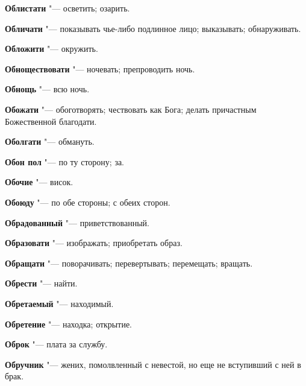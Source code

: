\begin{mymulticols}{2}
\noindent\textbf{Облистати} "--- осветить; озарить. 




\noindent\textbf{Обличати} "--- показывать чье-либо подлинное лицо; выказывать; обнаруживать. 




\noindent\textbf{Обложити} "--- окружить. 




\noindent\textbf{Обноществовати} "--- ночевать; препроводить ночь. 




\noindent\textbf{Обнощь} "--- всю ночь. 




\noindent\textbf{Обожати} "--- обоготворять; чествовать как Бога; делать причастным Божественной благодати. 




\noindent\textbf{Оболгати} "--- обмануть. 




\noindent\textbf{Обон пол} "--- по ту сторону; за. 




\noindent\textbf{Обочие} "--- висок. 




\noindent\textbf{Обоюду} "--- по обе стороны; с обеих сторон. 




\noindent\textbf{Обрадованный} "--- приветствованный. 




\noindent\textbf{Образовати} "--- изображать; приобретать образ. 




\noindent\textbf{Обращати} "--- поворачивать; перевертывать; перемещать; вращать. 




\noindent\textbf{Обрести} "--- найти. 




\noindent\textbf{Обретаемый} "--- находимый. 




\noindent\textbf{Обретение} "--- находка; открытие. 




\noindent\textbf{Оброк} "--- плата за службу. 




\noindent\textbf{Обручник} "--- жених, помолвленный с невестой, но еще не вступивший с ней в брак. 





\end{mymulticols}

